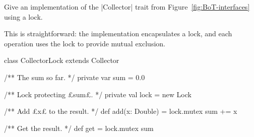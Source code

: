 \begin{questionS}
\label{ex:summer-monitor}
Give an implementation of the |Collector| trait from
Figure~\ref{fig:BoT-interfaces} using a lock.
\end{questionS}


\begin{answerS}
This is straightforward: the implementation encapsulates a lock, and each
operation uses the lock to provide mutual exclusion.
% 
\begin{scala}
class CollectorLock extends Collector{
  /** The sum so far. */
  private var sum = 0.0

  /** Lock protecting £sum£. */
  private val lock = new Lock

  /** Add £x£ to the result. */
  def add(x: Double) = lock.mutex{ sum += x }

  /** Get the result. */
  def get = lock.mutex{ sum }
}
\end{scala}
\end{answerS}
